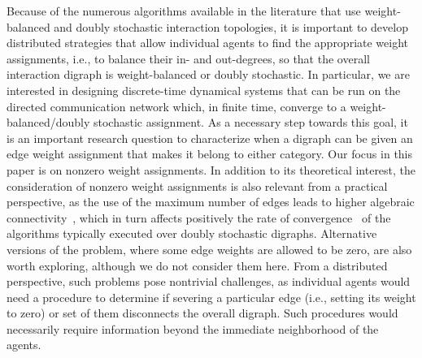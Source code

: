 \documentclass[final]{siamltex}
\begin{document}
Because of the numerous algorithms available in the literature that
use weight-balanced and doubly stochastic interaction topologies, it
is important to develop distributed strategies that allow individual
agents to find the appropriate weight assignments, i.e., to balance
their in- and out-degrees, so that the overall interaction digraph is
weight-balanced or doubly stochastic.  In particular, we are
interested in designing discrete-time dynamical systems that can be
run on the directed communication network which, in finite time,
converge to a weight-balanced/doubly stochastic assignment.  As a
necessary step towards this goal, it is an important research question
to characterize when a digraph can be given an edge weight assignment
that makes it belong to either category. Our focus in this paper is on
nonzero weight assignments. In addition to its theoretical interest,
the consideration of nonzero weight assignments is also relevant from
a practical perspective, as the use of the maximum number of edges
leads to higher algebraic connectivity~\cite{CWW:05}, which in turn
affects positively the rate of
convergence~\cite{SB-AG-BP-DS:06,JL-ASM-BDOA-CY:09,MC-CWW:07,AG-SB:06}
of the algorithms typically executed over doubly stochastic digraphs.
Alternative versions of the problem, where some edge weights are
allowed to be zero, are also worth exploring, although we do not
consider them here. From a distributed perspective, such problems pose
nontrivial challenges, as individual agents would need a procedure to
determine if severing a particular edge (i.e., setting its weight to
zero) or set of them disconnects the overall digraph. Such procedures
would necessarily require information beyond the immediate
neighborhood of the agents.
\end{document}
